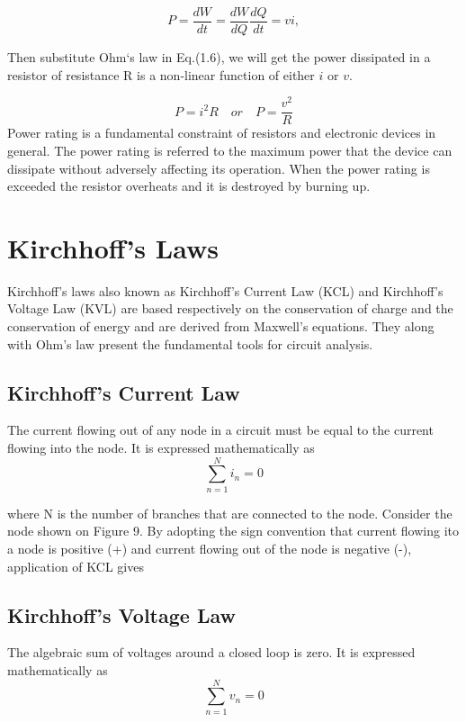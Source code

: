 \documentclass[a4 paper]{article}
\numberwithin{equation}{section}
\newcommand{\0}{\mathbf{0}}
\begin{document}
\begin{equation}
P = \frac{dW}{dt} = \frac{dW}{dQ}\frac{dQ}{dt}=vi,
\end{equation}

Then substitute Ohm`s law in Eq.(1.6), we will get the power dissipated in a resistor of resistance R is a non-linear function of either $i$ or $v$.

\begin{equation}
P = i^2R \quad or \quad P = \frac{v^2}{R}
\end{equation}
Power rating is a fundamental constraint of resistors and electronic devices in general. The power rating is referred to the maximum power that the device can dissipate without adversely affecting its operation. When the power rating is exceeded the resistor overheats and it is destroyed by burning up. 





\section{Kirchhoff’s Laws}
Kirchhoff’s laws also known as Kirchhoff’s Current Law (KCL) and Kirchhoff’s Voltage Law (KVL) are based respectively on the conservation of charge and the conservation of energy and are derived from Maxwell’s equations. They along with Ohm’s law present the fundamental tools for circuit analysis.
\subsection{Kirchhoff’s Current Law}
The current flowing out of any node in a circuit
must be equal to the current flowing into the node. It is expressed mathematically as
\begin{equation}
\sum_{n=1}^{N}i_n=0
\end{equation}

where N is the number of branches that are connected to the node. Consider the node shown on Figure 9. By adopting the sign convention that current flowing ito a node is positive (+) and current flowing out of the node is negative (-), application of KCL gives
\subsection{Kirchhoff’s Voltage Law}
The algebraic sum of voltages around a closed loop is zero. It is expressed mathematically as
\begin{equation}
\sum_{n=1}^{N}v_n=0
\end{equation}
\end{document}

